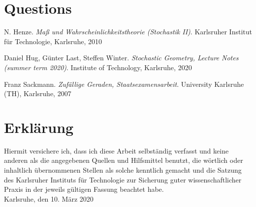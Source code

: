 \documentclass[12pt,a4paper]{scrartcl}
\numberwithin{equation}{subsection}
\newcommand{\1}{\mathbbm{1}}
\numberwithin{equation}{section}
\theoremstyle{definition}
\begin{document}
\newpage
\section{Questions}

\newpage

\begin{thebibliography}{biblio}
\thispagestyle{empty}

N. Henze.
\emph{Maß und Wahrscheinlichkeitstheorie (Stochastik II)}.
Karlsruher Institut für Technologie, Karlsruhe, 2010

Daniel Hug, Günter Last, Steffen Winter.
\emph{Stochastic Geometry, 	Lecture Notes (summer term 2020)}.
Institute of Technology, Karlsruhe, 2020

Franz Sackmann. 
\emph{Zufällige Geraden, Staatsexamensarbeit}.
University Karlsruhe (TH), Karlsruhe, 2007



\end{thebibliography}

\newpage
  
\thispagestyle{empty}

\vspace*{8cm}


\section*{Erklärung}

Hiermit versichere ich, dass ich diese Arbeit selbständig verfasst und keine anderen als die angegebenen Quellen und Hilfsmittel benutzt, die wörtlich oder inhaltlich übernommenen Stellen als solche kenntlich gemacht und die Satzung des Karlsruher Instituts für Technologie zur Sicherung guter wissenschaftlicher Praxis in der jeweils gültigen Fassung beachtet habe. \\[2ex] 

\noindent
Karlsruhe, den 10. März 2020\\[5ex] 
\end{document}
